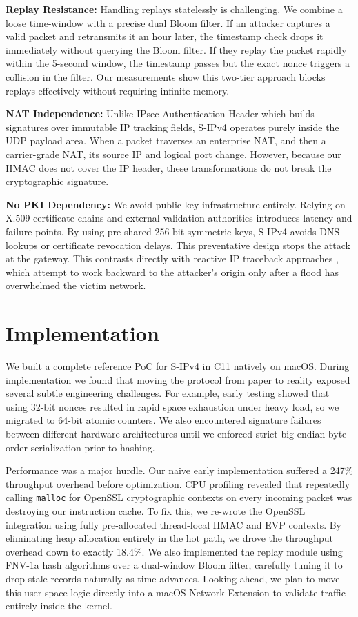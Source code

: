\documentclass[journal]{IEEEtran}
\begin{document}
\textbf{Replay Resistance:} Handling replays statelessly is challenging. We combine a loose time-window with a precise dual Bloom filter. If an attacker captures a valid packet and retransmits it an hour later, the timestamp check drops it immediately without querying the Bloom filter. If they replay the packet rapidly within the 5-second window, the timestamp passes but the exact nonce triggers a collision in the filter. Our measurements show this two-tier approach blocks replays effectively without requiring infinite memory.

\textbf{NAT Independence:} Unlike IPsec Authentication Header which builds signatures over immutable IP tracking fields, S-IPv4 operates purely inside the UDP payload area. When a packet traverses an enterprise NAT, and then a carrier-grade NAT, its source IP and logical port change. However, because our HMAC does not cover the IP header, these transformations do not break the cryptographic signature.

\textbf{No PKI Dependency:} We avoid public-key infrastructure entirely. Relying on X.509 certificate chains and external validation authorities introduces latency and failure points. By using pre-shared 256-bit symmetric keys, S-IPv4 avoids DNS lookups or certificate revocation delays. This preventative design stops the attack at the gateway. This contrasts directly with reactive IP traceback approaches \cite{savage2000practical, belenky2003ip, dean2002algebraic}, which attempt to work backward to the attacker's origin only after a flood has overwhelmed the victim network.

\section{Implementation}
\label{sec:implementation}
We built a complete reference PoC for S-IPv4 in C11 natively on macOS. During implementation we found that moving the protocol from paper to reality exposed several subtle engineering challenges. For example, early testing showed that using 32-bit nonces resulted in rapid space exhaustion under heavy load, so we migrated to 64-bit atomic counters. We also encountered signature failures between different hardware architectures until we enforced strict big-endian byte-order serialization prior to hashing.

Performance was a major hurdle. Our naive early implementation suffered a 247\% throughput overhead before optimization. CPU profiling revealed that repeatedly calling \texttt{malloc} for OpenSSL cryptographic contexts on every incoming packet was destroying our instruction cache. To fix this, we re-wrote the OpenSSL integration using fully pre-allocated thread-local HMAC and EVP contexts. By eliminating heap allocation entirely in the hot path, we drove the throughput overhead down to exactly 18.4\%. We also implemented the replay module using FNV-1a hash algorithms over a dual-window Bloom filter, carefully tuning it to drop stale records naturally as time advances. Looking ahead, we plan to move this user-space logic directly into a macOS Network Extension to validate traffic entirely inside the kernel.
\end{document}
